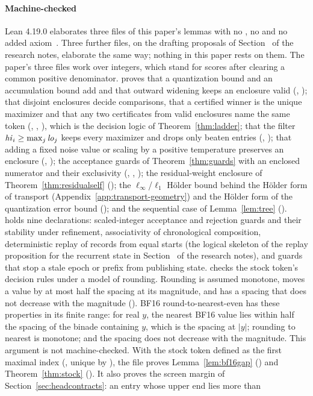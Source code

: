 \paragraph{Machine-checked} Lean 4.19.0 elaborates three files of this paper's lemmas with no , no  and no added axiom~. Three further files, on the drafting proposals of Section~ of the research notes, elaborate the same way; nothing in this paper rests on them. The paper's three files work over integers, which stand for scores after clearing a common positive denominator.  proves that a quantization bound and an accumulation bound add and that outward widening keeps an enclosure valid (, ); that disjoint enclosures decide comparisons, that a certified winner is the unique maximizer and that any two certificates from valid enclosures name the same token (, , ), which is the decision logic of Theorem~\ref{thm:ladder}; that the filter $\mathit{hi}_i\ge\max_j\mathit{lo}_j$ keeps every maximizer and drops only beaten entries (, ); that adding a fixed noise value or scaling by a positive temperature preserves an enclosure (, ); the acceptance guards of Theorem~\ref{thm:guards} with an enclosed numerator and their exclusivity (, , ); the residual-weight enclosure of Theorem~\ref{thm:residualself} (); the $\ell_\infty$/$\ell_1$ Hölder bound behind the Hölder form of transport (Appendix~\ref{app:transport-geometry}) and the Hölder form of the quantization error bound (); and the sequential case of Lemma~\ref{lem:tree} ().  holds nine declarations: scaled-integer acceptance and rejection guards and their stability under refinement, associativity of chronological composition, deterministic replay of records from equal starts (the logical skeleton of the replay proposition for the recurrent state in Section~ of the research notes), and guards that stop a stale epoch or prefix from publishing state.  checks the stock token's decision rules under a model of rounding. Rounding is assumed monotone, moves a value by at most half the spacing at its magnitude, and has a spacing that does not decrease with the magnitude (). BF16 round-to-nearest-even has these properties in its finite range: for real $y$, the nearest BF16 value lies within half the spacing of the binade containing $y$, which is the spacing at $|y|$; rounding to nearest is monotone; and the spacing does not decrease with the magnitude. This argument is not machine-checked. With the stock token defined as the first maximal index (, unique by ), the file proves Lemma~\ref{lem:bf16gap} () and Theorem~\ref{thm:stock} (). It also proves the screen margin of Section~\ref{sec:headcontracts}: an entry whose upper end lies more than 